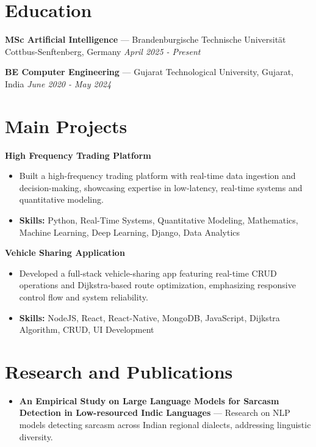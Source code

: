 \documentclass[a4paper,10pt]{article}
\begin{document}
\section*{Education}
\textbf{MSc Artificial Intelligence} — Brandenburgische Technische Universität Cottbus-Senftenberg, Germany \hfill \textit{April 2025 - Present}\par
\vspace{1.5pt}
\textbf{BE Computer Engineering} — Gujarat Technological University, Gujarat, India \hfill \textit{June 2020 - May 2024}\par

\section*{Main Projects}
\textbf{High Frequency Trading Platform}\par
\vspace{1pt}
\begin{itemize}
  \item Built a high-frequency trading platform with real-time data ingestion and decision-making, showcasing expertise in low-latency, real-time systems and quantitative modeling.
  \item \textbf{Skills:} Python, Real-Time Systems, Quantitative Modeling, Mathematics, Machine Learning, Deep Learning, Django, Data Analytics
\end{itemize}
\vspace{3pt}
\textbf{Vehicle Sharing Application}\par
\vspace{1pt}
\begin{itemize}
  \item Developed a full-stack vehicle-sharing app featuring real-time CRUD operations and Dijkstra-based route optimization, emphasizing responsive control flow and system reliability.
  \item \textbf{Skills:} NodeJS, React, React-Native, MongoDB, JavaScript, Dijkstra Algorithm, CRUD, UI Development
\end{itemize}

\section*{Research and Publications}
\begin{itemize}
\item \textbf{An Empirical Study on Large Language Models for Sarcasm Detection in Low-resourced Indic Languages} — Research on NLP models detecting sarcasm across Indian regional dialects, addressing linguistic diversity.
\end{itemize}
\end{document}
